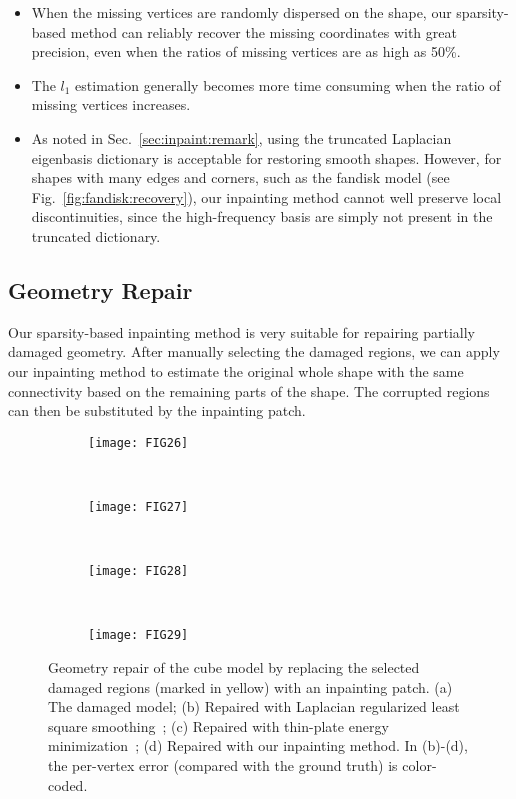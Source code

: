 \begin{itemize}
  \item When the missing vertices are randomly dispersed on the shape, our
        sparsity-based method can reliably recover the missing coordinates
        with great precision, even when the ratios of missing vertices are
        as high as 50\%.
  \item The $l_1$ estimation generally becomes more time consuming when the
        ratio of missing vertices increases.
  \item As noted in Sec.~\ref{sec:inpaint:remark}, using the truncated Laplacian
        eigenbasis dictionary is acceptable for restoring smooth shapes.
        However, for shapes with many edges and corners, such as the fandisk
        model (see Fig.~\ref{fig:fandisk:recovery}), our inpainting method
        cannot well preserve local discontinuities, since the high-frequency
        basis are simply not present in the truncated dictionary.
\end{itemize}

\subsection{Geometry Repair}
Our sparsity-based inpainting method is very suitable for repairing partially
damaged geometry. After manually selecting the damaged regions, we can apply
our inpainting method to estimate the original whole shape with the same
connectivity based on the remaining parts of the shape. The corrupted regions
can then be substituted by the inpainting patch.

\begin{figure}
    \centering
    \begin{subfigure}[b]{0.23\linewidth}
        \texttt{[image: FIG26]}
        \caption{}
    \end{subfigure}%
    ~
    \begin{subfigure}[b]{0.23\linewidth}
        \texttt{[image: FIG27]}
        \caption{}
    \end{subfigure}
    ~
    \begin{subfigure}[b]{0.23\linewidth}
        \texttt{[image: FIG28]}
        \caption{}
    \end{subfigure}
    ~
    \begin{subfigure}[b]{0.23\linewidth}
        \texttt{[image: FIG29]}
        \caption{}
    \end{subfigure}
\caption[Geometry repair of the damaged cube model.] 
        {Geometry repair of the cube model by replacing the selected damaged regions (marked in yellow) with an inpainting patch.
         (a) The damaged model; (b) Repaired with Laplacian regularized least square smoothing~\cite{Nealen2006};
         (c) Repaired with thin-plate energy minimization~\cite{Bac2008};
         (d) Repaired with our inpainting method. In (b)-(d), the per-vertex error (compared with the ground truth) is color-coded.}
\label{fig:repair:cube}
\end{figure}

